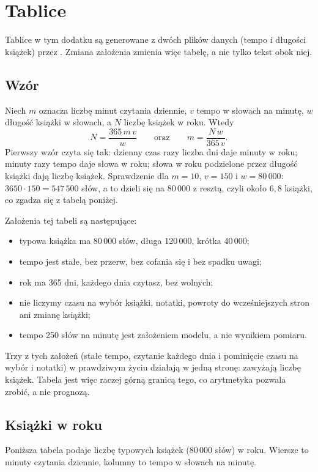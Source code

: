 \chapter{Tablice}

Tablice w tym dodatku są generowane z dwóch plików danych (tempo i długości książek)
przez . Zmiana założenia zmienia więc tabelę,
a nie tylko tekst obok niej.

\section{Wzór}
Niech $m$ oznacza liczbę minut czytania dziennie, $v$ tempo w słowach na minutę, $w$ długość
książki w słowach, a $N$ liczbę książek w roku. Wtedy
\[
N = \frac{365\,m\,v}{w}
\qquad\text{oraz}\qquad
m = \frac{N\,w}{365\,v}.
\]
Pierwszy wzór czyta się tak: dzienny czas razy liczba dni daje minuty w roku; minuty razy tempo
daje słowa w roku; słowa w roku podzielone przez długość książki dają liczbę książek. Sprawdzenie
dla $m = 10$, $v = 150$ i $w = 80\,000$: $3650 \cdot 150 = 547\,500$ słów, a to dzieli się na
$80\,000$ z resztą, czyli około $6{,}8$ książki, co zgadza się z tabelą poniżej.

Założenia tej tabeli są następujące:
\begin{itemize}
\item typowa książka ma 80\,000 słów, długa 120\,000, krótka 40\,000;
\item tempo jest stałe, bez przerw, bez cofania się i bez spadku uwagi;
\item rok ma 365 dni, każdego dnia czytasz, bez wolnych;
\item nie liczymy czasu na wybór książki, notatki, powroty do wcześniejszych stron ani zmianę książki;
\item tempo 250 słów na minutę jest założeniem modelu, a nie wynikiem pomiaru.
\end{itemize}
Trzy z tych założeń (stałe tempo, czytanie każdego dnia i pominięcie czasu na wybór i notatki)
w prawdziwym życiu działają w jedną stronę: zawyżają liczbę książek. Tabela jest więc raczej górną
granicą tego, co arytmetyka pozwala zrobić, a nie prognozą.

\section{Książki w roku}
Poniższa tabela podaje liczbę typowych książek (80\,000 słów) w roku. Wiersze to minuty czytania
dziennie, kolumny to tempo w słowach na minutę.

